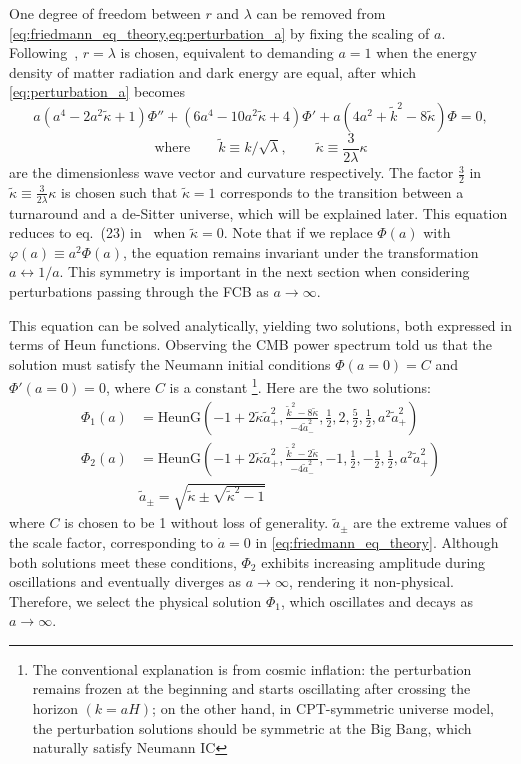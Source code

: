 One degree of freedom between \(r\) and \(\lambda\) can be removed from \cref{eq:friedmann_eq_theory,eq:perturbation_a} by fixing the scaling of \(a\). Following~\cite{2022PhRvD.105h3514L}, \(r = \lambda\) is chosen, equivalent to demanding \(a=1\) when the energy density of matter radiation and dark energy are equal, after which \cref{eq:perturbation_a} becomes
\begin{equation}\label{eq:Phi_ODE}
    a(a^4 - 2a^2 \tilde\kappa + 1) \Phi'' + (6a^4- 10a^2 \tilde\kappa + 4 ) \Phi' + a(4a^2 + \tilde{k}^2-8\tilde\kappa) \Phi = 0, 
\end{equation}
\vspace{-2.5em}
\[ \text{where} \qquad
    \tilde{k} \equiv k/\sqrt{\lambda}, \qquad \tilde \kappa \equiv \frac{3}{2\lambda}\kappa\]
are the dimensionless wave vector and curvature respectively. The factor $\frac{3}{2}$ in $\tilde\kappa\equiv \frac{3}{2\lambda}\kappa$ is chosen such that $\tilde\kappa=1$ corresponds to the transition between a turnaround and a de-Sitter universe, which will be explained later. This equation reduces to eq.~(23) in~\citet{2022PhRvD.105h3514L} when \( \tilde\kappa = 0 \).
Note that if we replace \(\Phi(a)\) with \(\varphi(a) \equiv a^2 \Phi(a)\), the equation remains invariant under the transformation \({a\leftrightarrow1/a}\). This symmetry is important in the next section when considering perturbations passing through the FCB as \(a\rightarrow \infty\).

This equation can be solved analytically, yielding two solutions, both expressed in terms of Heun functions. Observing the CMB power spectrum told us that the solution must satisfy the Neumann initial conditions \(\Phi(a = 0) = C\) and \(\Phi'(a = 0) = 0\), where \(C\) is a constant \footnote{The conventional explanation is from cosmic inflation: the perturbation remains frozen at the beginning and starts oscillating after crossing the horizon \((k = aH)\); on the other hand, in CPT-symmetric universe model, the perturbation solutions should be symmetric at the Big Bang, which naturally satisfy Neumann IC}. Here are the two solutions:
\begin{equation}
\begin{aligned}\label{eq:Heun}
    \Phi_1(a) &= \text{HeunG} \left( -1+2\tilde\kappa \tilde a_+^2,\frac{\tilde k^2-8\tilde\kappa}{-4 \tilde a_-^2},\frac{1}{2},2, \frac{5}{2},\frac{1}{2},a^2\tilde a_+^2\right)\\
    \Phi_2(a) &= \text{HeunG}\left(-1+2\tilde\kappa \tilde a_+^2,\frac{\tilde k^2-2\tilde\kappa}{-4\tilde a_-^2},-1,\frac{1}{2},-\frac{1}{2},\frac{1}{2},a^2\tilde a_+^2\right)\\
    &\tilde a_{\pm}=\sqrt{\tilde\kappa\pm\sqrt{\tilde\kappa^2-1}}
\end{aligned}
\end{equation}
where \(C\) is chosen to be 1 without loss of generality. \(\tilde{a}_{\pm}\) are the extreme values of the scale factor, corresponding to \(\dot{a}=0\) in \cref{eq:friedmann_eq_theory}. Although both solutions meet these conditions, $\Phi_2$ exhibits increasing amplitude during oscillations and eventually diverges as \(a \to \infty\), rendering it non-physical. Therefore, we select the physical solution $\Phi_1$, which oscillates and decays as \(a \to \infty\).


